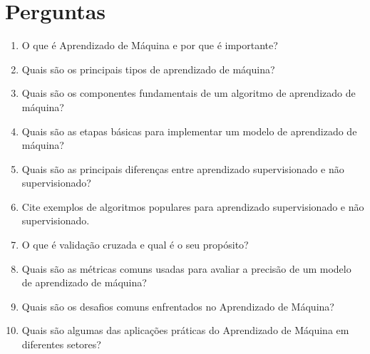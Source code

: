 \documentclass{article}
\begin{document}
\section{Perguntas}
 \begin{enumerate}    
    \item O que é Aprendizado de Máquina e por que é importante?
    \item Quais são os principais tipos de aprendizado de máquina?
    \item Quais são os componentes fundamentais de um algoritmo de aprendizado de máquina?
    \item Quais são as etapas básicas para implementar um modelo de aprendizado de máquina?
    \item Quais são as principais diferenças entre aprendizado supervisionado e não supervisionado?
    \item Cite exemplos de algoritmos populares para aprendizado supervisionado e não supervisionado.
    \item O que é validação cruzada e qual é o seu propósito?
    \item Quais são as métricas comuns usadas para avaliar a precisão de um modelo de aprendizado de máquina?
    \item Quais são os desafios comuns enfrentados no Aprendizado de Máquina?
    \item Quais são algumas das aplicações práticas do Aprendizado de Máquina em diferentes setores?
 \end{enumerate}  

 
 
\end{document}
